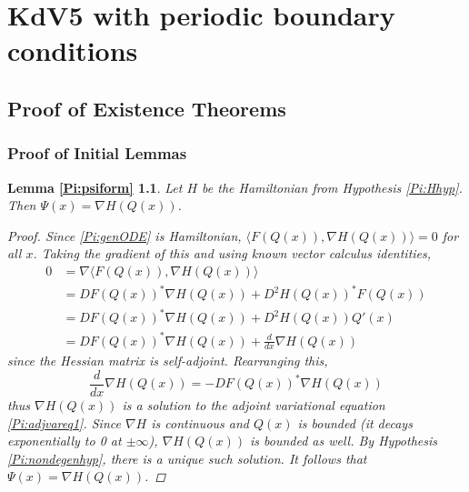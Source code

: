\documentclass[thesis.tex]{subfiles}
\begin{document}
\chapter{KdV5 with periodic boundary conditions}

\section{Proof of Existence Theorems}

\subsection{Proof of Initial Lemmas}

\newtheorem*{lemma:psiform}{Lemma \ref{Pi:psiform}}
\begin{lemma:psiform}
Let $H$ be the Hamiltonian from Hypothesis \ref{Pi:Hhyp}. Then $\Psi(x) = \nabla H(Q(x))$.
\begin{proof}
Since \eqref{Pi:genODE} is Hamiltonian, $\langle F(Q(x)), \nabla H(Q(x)) \rangle = 0$ for all $x$. Taking the gradient of this and using known vector calculus identities,
\begin{align*}
0 &= \nabla \langle F(Q(x)), \nabla H(Q(x)) \rangle \\
&= D F(Q(x))^* \nabla H(Q(x)) + D^2 H(Q(x))^* F(Q(x)) \\
&= D F(Q(x))^* \nabla H(Q(x)) + D^2 H(Q(x)) Q'(x) \\
&= D F(Q(x))^* \nabla H(Q(x)) + \frac{d}{dx} \nabla H(Q(x))
\end{align*}
since the Hessian matrix is self-adjoint. Rearranging this,
\begin{equation*}
\frac{d}{dx} \nabla H(Q(x)) = -D F(Q(x))^* \nabla H(Q(x)) 
\end{equation*}
thus $\nabla H(Q(x))$ is a solution to the adjoint variational equation \eqref{Pi:adjvareq1}. Since $\nabla H$ is continuous and $Q(x)$ is bounded (it decays exponentially to 0 at $\pm \infty$), $\nabla H(Q(x))$ is bounded as well. By Hypothesis \ref{Pi:nondegenhyp}, there is a unique such solution. It follows that $\Psi(x) = \nabla H(Q(x))$.
\end{proof}
\end{lemma:psiform}
\end{document}
